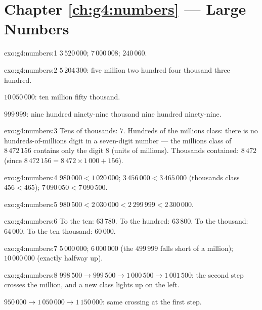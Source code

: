\section*{Chapter \ref{ch:g4:numbers} --- Large Numbers}

\begin{solution}{exo:g4:numbers:1}
$3\,520\,000$; \quad $7\,000\,008$; \quad $240\,060$.
\end{solution}

\begin{solution}{exo:g4:numbers:2}
$5\,204\,300$: five million two hundred four thousand three hundred.

$10\,050\,000$: ten million fifty thousand.

$999\,999$: nine hundred ninety-nine thousand nine hundred
ninety-nine.
\end{solution}

\begin{solution}{exo:g4:numbers:3}
Tens of thousands: $7$. Hundreds of the millions class: there is no
hundreds-of-millions digit in a seven-digit number --- the millions
class of $8\,472\,156$ contains only the digit $8$ (units of
millions). Thousands contained: $8\,472$ (since
$8\,472\,156 = 8\,472 \times 1\,000 + 156$).
\end{solution}

\begin{solution}{exo:g4:numbers:4}
$980\,000 < 1\,020\,000$; \quad
$3\,456\,000 < 3\,465\,000$ (thousands class $456 < 465$); \quad
$7\,090\,050 < 7\,090\,500$.
\end{solution}

\begin{solution}{exo:g4:numbers:5}
$980\,500 < 2\,030\,000 < 2\,299\,999 < 2\,300\,000$.
\end{solution}

\begin{solution}{exo:g4:numbers:6}
To the ten: $63\,780$. To the hundred: $63\,800$. To the thousand:
$64\,000$. To the ten thousand: $60\,000$.
\end{solution}

\begin{solution}{exo:g4:numbers:7}
$5\,000\,000$; \quad $6\,000\,000$ (the $499\,999$ falls short of
 a million); \quad $10\,000\,000$ (exactly halfway  up).
\end{solution}

\begin{solution}{exo:g4:numbers:8}
$998\,500 \to 999\,500 \to 1\,000\,500 \to 1\,001\,500$: the second
step crosses the million, and a new class lights up on the left.

$950\,000 \to 1\,050\,000 \to 1\,150\,000$: same crossing at the
first step.
\end{solution}

